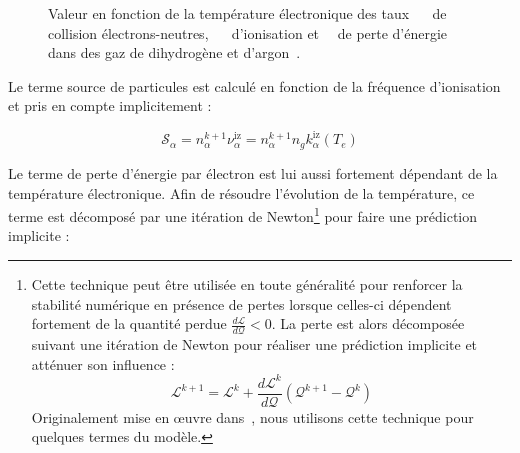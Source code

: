 \begin{refsection}
\begin{figure}[!htbp]
    \centering
    \caption{Valeur en fonction de la température électronique des taux
    ~~ de collision électrons-neutres,
    ~~ d'ionisation et~~ de perte
    d'énergie dans des gaz de dihydrogène et d'argon~\parencite{siglo}.}
    \label{3-tauxcollision}
\end{figure}

Le terme source de particules est calculé en fonction de la fréquence
d'ionisation et pris en compte implicitement :

\begin{equation}
\mathcal{S}_{\alpha}=n_\alpha^{k+1} \nu_\alpha^\text{iz}=n_\alpha^{k+1} n_g
k_{\alpha}^\text{iz}(T_e)
\end{equation}

Le terme de perte d'énergie par électron est lui aussi fortement dépendant de la
température électronique. Afin de
résoudre l'évolution de la température, ce terme est décomposé par une itération
de Newton\footnote{Cette technique peut être utilisée en toute généralité pour
renforcer la stabilité numérique en présence de pertes lorsque celles-ci
dépendent fortement de la quantité perdue 
$\frac{d\mathcal L}{d\mathcal Q}<0$.
La perte est alors décomposée suivant une itération de Newton pour
réaliser une prédiction implicite et atténuer son influence :
\begin{equation*}
\mathcal L^{k+1}=\mathcal L^{k}+\frac{d\mathcal L^{k}}{d\mathcal Q}(\mathcal
Q^{k+1}-\mathcal Q^k) \end{equation*}
Originalement mise en \oe uvre dans~\parencite{HagelaarImpl}, nous utilisons
cette technique pour quelques termes du modèle.} pour faire une prédiction implicite :


\end{refsection}

